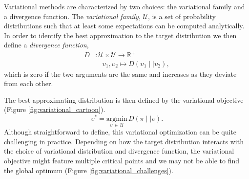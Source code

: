 Variational methods are characterized by two choices: the variational
family and a divergence function. The \emph{variational family}, 
$\mathcal{U}$, is a set of probability distributions such that at least 
some expectations can be computed analytically.  In order to identify 
the best approximation to the target distribution we then define a 
\emph{divergence function},
%
\begin{align*}
D &: 
\mathcal{U} \times \mathcal{U}
\rightarrow \mathbb{R}^{+}
\\
& \quad \upsilon_{1}, \upsilon_{2} 
\mapsto D \! \left( \upsilon_{1} \mid\mid \upsilon_{2} \right),
\end{align*}
%
which is zero if the two arguments are the same and increases as they 
deviate from each other.

The best approximating distribution is then defined by the variational 
objective (Figure \ref{fig:variational_cartoon}).
%
\begin{equation*}
\upsilon^{*}
= 
\underset{\upsilon \, \in \, \mathcal{U}}{\mathrm{argmin}} \,
D \! \left( \pi \mid\mid \upsilon \right).
\end{equation*}
%
Although straightforward to define, this variational optimization can be
quite challenging in practice.  Depending on how the target distribution
interacts with the choice of variational distribution and divergence
function, the variational objective might feature multiple critical points
and we may not be able to find the global optimum
(Figure \ref{fig:variational_challenges}).

